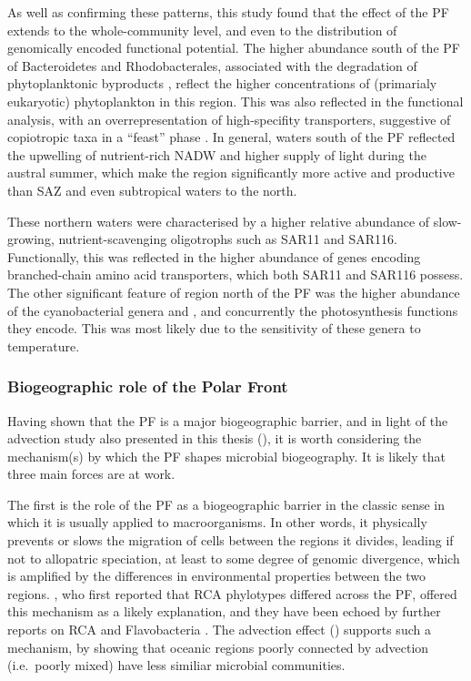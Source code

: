 As well as confirming these patterns, this study found that the effect of the \ac{PF} extends to the whole-community level, and even to the distribution of genomically encoded functional potential.
The higher abundance south of the \ac{PF} of Bacteroidetes and Rhodobacterales, associated with the degradation of phytoplanktonic byproducts \citep[e.g.][]{Buchan:2005hd,Williams:2012gsa}, reflect the higher concentrations of (primarialy eukaryotic) phytoplankton in this region. 
This was also reflected in the functional analysis, with an overrepresentation of high-specifity transporters, suggestive of copiotropic taxa in a ``feast'' phase \cite{Lauro:2009gx}.
In general, waters south of the \ac{PF} reflected the upwelling of nutrient-rich \ac{NADW} and higher supply of light during the austral summer, which make the region significantly more active and productive than \ac{SAZ} and even subtropical waters to the north.

These northern waters were characterised by a higher relative abundance of slow-growing, nutrient-scavenging oligotrophs such as SAR11 and SAR116.
Functionally, this was reflected in the higher abundance of genes encoding branched-chain amino acid transporters, which both SAR11 and SAR116 possess.
The other significant feature of region north of the \ac{PF} was the higher abundance of the cyanobacterial genera  and , and concurrently the photosynthesis functions they encode.
This was most likely due to the sensitivity of these genera to temperature.

\subsubsection{Biogeographic role of the Polar Front}

Having shown that the \ac{PF} is a major biogeographic barrier, and in light of the advection study also presented in this thesis (), it is worth considering the mechanism(s) by which the \ac{PF} shapes microbial biogeography.
It is likely that three main forces are at work.

The first is the role of the \ac{PF} as a biogeographic barrier in the classic sense in which it is usually applied to macroorganisms.
In other words, it physically prevents or slows the migration of cells between the regions it divides, leading if not to allopatric speciation, at least to some degree of genomic divergence, which is amplified by the differences in environmental properties between the two regions.
\citet{Selje:2004ka}, who first reported that \ac{RCA} phylotypes differed across the \ac{PF}, offered this mechanism as a likely explanation, and they have been echoed by further reports on RCA \cite{Giebel:2009hr} and Flavobacteria \cite{Abell:2005ji}.
The advection effect () supports such a mechanism, by showing that oceanic regions poorly connected by advection (i.e.\ poorly mixed) have less similiar microbial communities.

